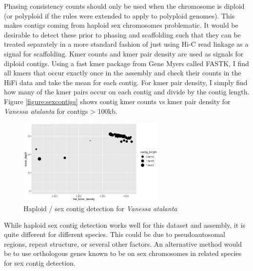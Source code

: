 {\par{
Phasing consistency counts should only be used when the chromosome is diploid (or polyploid if the rules were extended to apply to polyploid genomes). This makes contigs coming from haploid sex chromosomes problematic. It would be desirable to detect these prior to phasing and scaffolding such that they can be treated separately in a more standard fashion of just using Hi-C read linkage as a signal for scaffolding. Kmer counts and kmer pair density are used as signals for diploid contigs. Using a fast kmer package from Gene Myers called FASTK\cite{fastk}, I find all kmers that occur exactly once in the assembly and check their counts in the HiFi data and take the mean for each contig. For kmer pair density, I simply find how many of the kmer pairs occur on each contig and divide by the contig length. Figure \ref{figure:sexcontigs} shows contig kmer counts vs kmer pair density for \textit{Vanessa atalanta} for contigs > 100kb.
}

\begin{figure}[htbp!]
\caption{Haploid / sex contig detection for \textit{Vanessa atalanta}}
\label{figure:sexcontig}
\begin{centering}
\includegraphics[width=0.65\textwidth]{sexcontig.png}
\end{centering}
\end{figure}

\par{
While haploid sex contig detection works well for this dataset and assembly, it is quite different for different species. This could be due to pseudoautosomal regions, repeat structure, or several other factors. An alternative method would be to use orthologous genes known to be on sex chromosomes in related species for sex contig detection.
}

}
